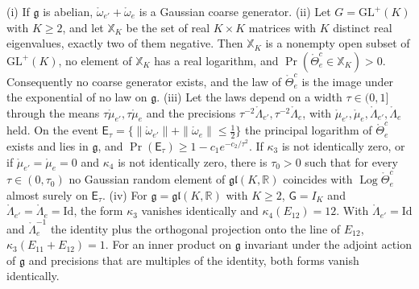 \begin{proposition}\label{prop:llp_coarse}
(i) If $\mathfrak g$ is abelian, $\mathring\omega_{e'}+\mathring\omega_e$ is a Gaussian coarse generator.
(ii) Let $G=\mathrm{GL}^+(K)$ with $K\geq2$, and let $\mathbb X_K$ be the set of real $K\times K$ matrices with $K$ distinct real eigenvalues, exactly two of them negative. Then $\mathbb X_K$ is a nonempty open subset of $\mathrm{GL}^+(K)$, no element of $\mathbb X_K$ has a real logarithm, and $\Pr(\mathring\Theta^c_e\in\mathbb X_K)>0$. Consequently no coarse generator exists, and the law of $\mathring\Theta^c_e$ is the image under the exponential of no law on $\mathfrak g$.
(iii) Let the laws depend on a width $\tau\in(0,1]$ through the means $\tau\mathring\mu_{e'},\tau\mathring\mu_e$ and the precisions $\tau^{-2}\mathring\Lambda_{e'},\tau^{-2}\mathring\Lambda_e$, with $\mathring\mu_{e'},\mathring\mu_e,\mathring\Lambda_{e'},\mathring\Lambda_e$ held. On the event $\mathsf E_\tau=\{\|\mathring\omega_{e'}\|+\|\mathring\omega_e\|\leq\frac12\}$ the principal logarithm of $\mathring\Theta^c_e$ exists and lies in $\mathfrak g$, and $\Pr(\mathsf E_\tau)\geq1-c_1e^{-c_2/\tau^2}$. If $\kappa_3$ is not identically zero, or if $\mathring\mu_{e'}=\mathring\mu_e=0$ and $\kappa_4$ is not identically zero, there is $\tau_0>0$ such that for every $\tau\in(0,\tau_0)$ no Gaussian random element of $\mathfrak{gl}(K,\mathbb R)$ coincides with $\operatorname{Log}\mathring\Theta^c_e$ almost surely on $\mathsf E_\tau$.
(iv) For $\mathfrak g=\mathfrak{gl}(K,\mathbb R)$ with $K\geq2$, $\mathsf G=I_K$ and $\mathring\Lambda_{e'}=\mathring\Lambda_e=\mathrm{Id}$, the form $\kappa_3$ vanishes identically and $\kappa_4(E_{12})=12$. With $\mathring\Lambda_{e'}=\mathrm{Id}$ and $\mathring\Lambda_e^{-1}$ the identity plus the orthogonal projection onto the line of $E_{12}$, $\kappa_3(E_{11}+E_{12})=1$. For an inner product on $\mathfrak g$ invariant under the adjoint action of $\mathfrak g$ and precisions that are multiples of the identity, both forms vanish identically.
\end{proposition}

